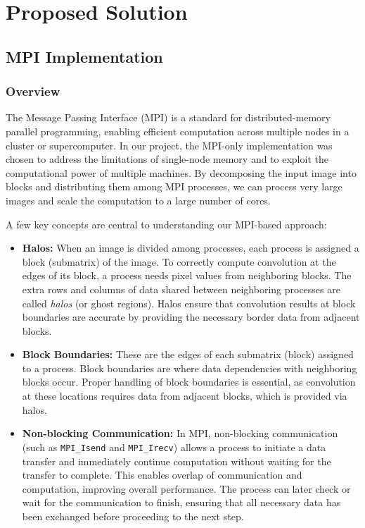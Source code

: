 \documentclass[conference, 10pt]{IEEEtran}
\begin{document}
\section{Proposed Solution}

\subsection{MPI Implementation}
\subsubsection{Overview}
The Message Passing Interface (MPI) is a standard for distributed-memory parallel programming, enabling efficient computation across multiple nodes in a cluster or supercomputer. In our project, the MPI-only implementation was chosen to address the limitations of single-node memory and to exploit the computational power of multiple machines. By decomposing the input image into blocks and distributing them among MPI processes, we can process very large images and scale the computation to a large number of cores.

A few key concepts are central to understanding our MPI-based approach:
\begin{itemize}
    \item \textbf{Halos:} When an image is divided among processes, each process is assigned a block (submatrix) of the image. To correctly compute convolution at the edges of its block, a process needs pixel values from neighboring blocks. The extra rows and columns of data shared between neighboring processes are called \textit{halos} (or ghost regions). Halos ensure that convolution results at block boundaries are accurate by providing the necessary border data from adjacent blocks.
    \item \textbf{Block Boundaries:} These are the edges of each submatrix (block) assigned to a process. Block boundaries are where data dependencies with neighboring blocks occur. Proper handling of block boundaries is essential, as convolution at these locations requires data from adjacent blocks, which is provided via halos.
    \item \textbf{Non-blocking Communication:} In MPI, non-blocking communication (such as \texttt{MPI\_Isend} and \texttt{MPI\_Irecv}) allows a process to initiate a data transfer and immediately continue computation without waiting for the transfer to complete. This enables overlap of communication and computation, improving overall performance. The process can later check or wait for the communication to finish, ensuring that all necessary data has been exchanged before proceeding to the next step.
\end{itemize}
\end{document}
